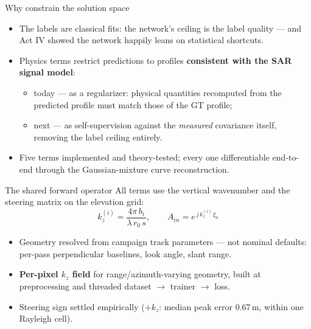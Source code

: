 \begin{frame}{Why constrain the solution space}
  \small
  \begin{itemize}
    \item The labels are classical fits: the network's ceiling is the label quality ---
          and Act IV showed the network happily leans on statistical shortcuts.
    \item Physics terms restrict predictions to profiles \textbf{consistent with the SAR
          signal model}:
    \begin{itemize}
      \item today --- as a regularizer: physical quantities recomputed from the predicted
            profile must match those of the GT profile;
      \item next --- as self-supervision against the \emph{measured} covariance itself,
            removing the label ceiling entirely.
    \end{itemize}
    \item Five terms implemented and theory-tested; every one differentiable end-to-end
          through the Gaussian-mixture curve reconstruction.
  \end{itemize}
\end{frame}

\begin{frame}{The shared forward operator}
  \small
  All terms use the vertical wavenumber and the steering matrix on the elevation grid:
  \[
    \boxed{\;k_z^{(i)} = \frac{4\pi\, b_i}{\lambda\, r_0\, s}, \qquad
    A_{in} = e^{\,j\, k_z^{(i)}\, \xi_n}\;}
  \]
  \begin{itemize}
    \item Geometry resolved from campaign track parameters --- not nominal defaults:
          per-pass perpendicular baselines, look angle, slant range.
    \item \textbf{Per-pixel $k_z$ field} for range/azimuth-varying geometry, built at
          preprocessing and threaded dataset $\to$ trainer $\to$ loss.
    \item Steering sign settled empirically ($+k_z$: median peak error 0.67\,m, within
          one Rayleigh cell).
  \end{itemize}
\end{frame}

